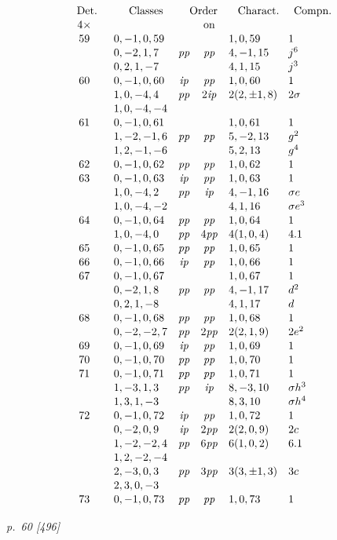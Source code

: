 ﻿\documentclass[11pt,a4paper]{article}
\theoremstyle{plain}
\theoremstyle{definition}
\newcommand{\pp}{\mathit{pp}}
\newcommand{\ip}{\mathit{ip}}
\newcommand{\sg}{\sigma}
\newcommand{\row}[7]{#1 & #2 & #3 & #4 & #5 & #6 & #7\\}
\begin{document}
\[
\renewcommand{\arraystretch}{1.06}
\begin{array}{c@{\quad}r@{\quad}l@{\quad}c@{\quad}c@{\quad}l@{\quad}l}
\multicolumn{1}{c}{\text{Det.}}&&
\multicolumn{1}{c}{\text{Classes}}&
\multicolumn{2}{c}{\text{Order}}&
\multicolumn{1}{c}{\text{Charact.}}&
\multicolumn{1}{c}{\text{Compn.}}\\
4\times&&& &\text{on}&&\\
\row{59}{}{0,-1,0,59}{}{}{1,0,59}{1}
\row{}{}{0,-2,1,7}{\pp}{\pp}{4,-1,15}{j^6}
\row{}{}{0,2,1,-7}{}{}{4,1,15}{j^3}
\row{60}{}{0,-1,0,60}{\ip}{\pp}{1,0,60}{1}
\row{}{}{1,0,-4,4}{\pp}{2\ip}{2(2,\pm1,8)}{2\sg}
\row{}{}{1,0,-4,-4}{}{}{}{}
\row{61}{}{0,-1,0,61}{}{}{1,0,61}{1}
\row{}{}{1,-2,-1,6}{\pp}{\pp}{5,-2,13}{g^2}
\row{}{}{1,2,-1,-6}{}{}{5,2,13}{g^4}
\row{62}{}{0,-1,0,62}{\pp}{\pp}{1,0,62}{1}
\row{63}{}{0,-1,0,63}{\ip}{\pp}{1,0,63}{1}
\row{}{}{1,0,-4,2}{\pp}{\ip}{4,-1,16}{\sg e}
\row{}{}{1,0,-4,-2}{}{}{4,1,16}{\sg e^3}
\row{64}{}{0,-1,0,64}{\pp}{\pp}{1,0,64}{1}
\row{}{}{1,0,-4,0}{\pp}{4\pp}{4(1,0,4)}{4.1}
\row{65}{}{0,-1,0,65}{\pp}{\pp}{1,0,65}{1}
\row{66}{}{0,-1,0,66}{\ip}{\pp}{1,0,66}{1}
\row{67}{}{0,-1,0,67}{}{}{1,0,67}{1}
\row{}{}{0,-2,1,8}{\pp}{\pp}{4,-1,17}{d^2}
\row{}{}{0,2,1,-8}{}{}{4,1,17}{d}
\row{68}{}{0,-1,0,68}{\pp}{\pp}{1,0,68}{1}
\row{}{}{0,-2,-2,7}{\pp}{2\pp}{2(2,1,9)}{2e^2}
\row{69}{}{0,-1,0,69}{\ip}{\pp}{1,0,69}{1}
\row{70}{}{0,-1,0,70}{\pp}{\pp}{1,0,70}{1}
\row{71}{}{0,-1,0,71}{\pp}{\pp}{1,0,71}{1}
\row{}{}{1,-3,1,3}{\pp}{\ip}{8,-3,10}{\sg h^3}
\row{}{}{1,3,1,-3}{}{}{8,3,10}{\sg h^4}
\row{72}{}{0,-1,0,72}{\ip}{\pp}{1,0,72}{1}
\row{}{}{0,-2,0,9}{\ip}{2\pp}{2(2,0,9)}{2c}
\row{}{}{1,-2,-2,4}{\pp}{6\pp}{6(1,0,2)}{6.1}
\row{}{}{1,2,-2,-4}{}{}{}{}
\row{}{}{2,-3,0,3}{\pp}{3\pp}{3(3,\pm1,3)}{3c}
\row{}{}{2,3,0,-3}{}{}{}{}
\row{73}{}{0,-1,0,73}{\pp}{\pp}{1,0,73}{1}
\end{array}
\]

\clearpage
\textit{p.~60 [496]}
\end{document}
